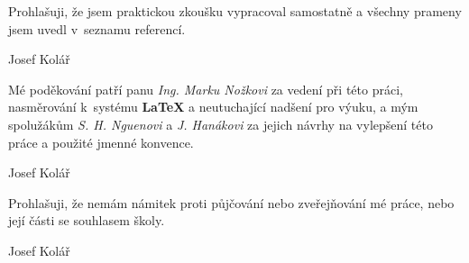 
\newenvironment{signaturedtext}{\large}{%
	\newline
    \begin{flushright}
		\begin{minipage}[H]{.5\textwidth}
			\begin{center}
				\dotfill\newline
				Josef Kolář
			\end{center}		
		\end{minipage}
	\end{flushright}
}

\clearpage
\thispagestyle{empty}

\begin{signaturedtext}
	Prohlašuji, že jsem praktickou zkoušku vypracoval samostatně a všechny prameny jsem uvedl v~seznamu referencí.
\end{signaturedtext}

\vspace*{\fill}

\begin{signaturedtext}
	Mé poděkování patří panu \emph{Ing. Marku Nožkovi} za vedení při této práci, nasměrování k~systému \textbf{\LaTeX} a neutuchající nadšení pro výuku, a mým spolužákům \emph{S. H. Nguenovi} a \emph{J. Hanákovi} za jejich návrhy na vylepšení této práce a použité jmenné konvence. 
\end{signaturedtext}
	
\vfill
	
\begin{signaturedtext}
	Prohlašuji, že nemám námitek proti půjčování nebo zveřejňování mé práce, nebo její části se souhlasem školy.
\end{signaturedtext}

\clearpage